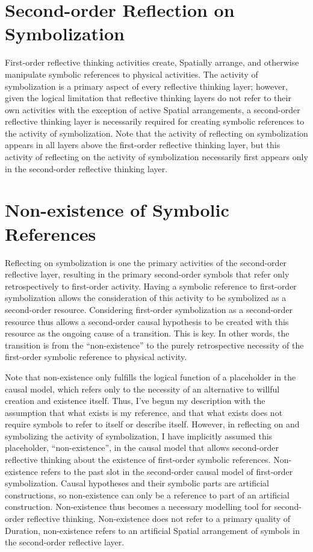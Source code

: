 \section{Second-order Reflection on Symbolization}

First-order reflective thinking activities create, Spatially arrange,
and otherwise manipulate symbolic references to physical activities.
The activity of symbolization is a primary aspect of every reflective
thinking layer; however, given the logical limitation that reflective
thinking layers do not refer to their own activities with the
exception of active Spatial arrangements, a second-order reflective
thinking layer is necessarily required for creating symbolic
references to the activity of symbolization.  Note that the activity
of reflecting on symbolization appears in all layers above the
first-order reflective thinking layer, but this activity of reflecting
on the activity of symbolization necessarily first appears only in the
second-order reflective thinking layer.

\section{Non-existence of Symbolic References}

Reflecting on symbolization is one the primary activities of the
second-order reflective layer, resulting in the primary second-order
symbols that refer only retrospectively to first-order activity.
Having a symbolic reference to first-order symbolization allows the
consideration of this activity to be symbolized as a second-order
resource.  Considering first-order symbolization as a second-order
resource thus allows a second-order causal hypothesis to be created
with this resource as the ongoing cause of a transition.  This is key.
In other words, the transition is from the ``non-existence'' to the
purely retrospective necessity of the first-order symbolic reference
to physical activity.

Note that non-existence only fulfills the logical function of a
placeholder in the causal model, which refers only to the necessity of
an alternative to willful creation and existence itself.  Thus, I've
begun my description with the assumption that what exists is my
reference, and that what exists does not require symbols to refer to
itself or describe itself.  However, in reflecting on and symbolizing
the activity of symbolization, I have implicitly assumed this
placeholder, ``non-existence'', in the causal model that allows
second-order reflective thinking about the existence of first-order
symbolic references.  Non-existence refers to the past slot in the
second-order causal model of first-order symbolization.  Causal
hypotheses and their symbolic parts are artificial constructions, so
non-existence can only be a reference to part of an artificial
construction.  Non-existence thus becomes a necessary modelling tool
for second-order reflective thinking.  Non-existence does not refer to
a primary quality of Duration, non-existence refers to an artificial
Spatial arrangement of symbols in the second-order reflective layer.

